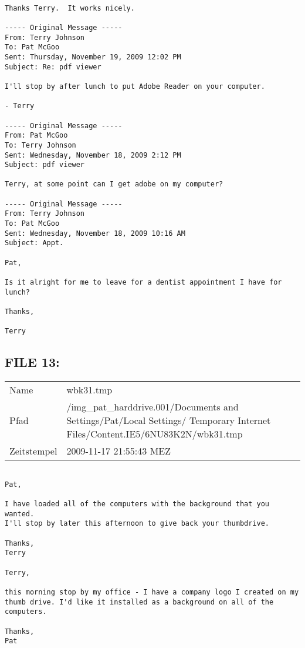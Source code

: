 \begin{lstlisting}

Thanks Terry.  It works nicely.

----- Original Message -----
From: Terry Johnson
To: Pat McGoo
Sent: Thursday, November 19, 2009 12:02 PM
Subject: Re: pdf viewer

I'll stop by after lunch to put Adobe Reader on your computer.

- Terry

----- Original Message -----
From: Pat McGoo
To: Terry Johnson
Sent: Wednesday, November 18, 2009 2:12 PM
Subject: pdf viewer

Terry, at some point can I get adobe on my computer?

----- Original Message -----
From: Terry Johnson
To: Pat McGoo
Sent: Wednesday, November 18, 2009 10:16 AM
Subject: Appt.

Pat,

Is it alright for me to leave for a dentist appointment I have for
lunch?

Thanks,

Terry
\end{lstlisting}

\subsection{FILE 13:}

\begin{table}[htb]
	\begin{tabular}{p{2cm} p{13.5cm}}
		Name & wbk31.tmp\\
		Pfad & /img_pat_harddrive.001/Documents and Settings/Pat/Local Settings/ Temporary Internet Files/Content.IE5/6NU83K2N/wbk31.tmp\\
		Zeitstempel & 2009-11-17 21:55:43 MEZ
	\end{tabular}
\end{table}	

\begin{lstlisting}

Pat,

I have loaded all of the computers with the background that you wanted. 
I'll stop by later this afternoon to give back your thumbdrive.

Thanks,
Terry

Terry,

this morning stop by my office - I have a company logo I created on my
thumb drive. I'd like it installed as a background on all of the
computers.

Thanks,
Pat
\end{lstlisting}